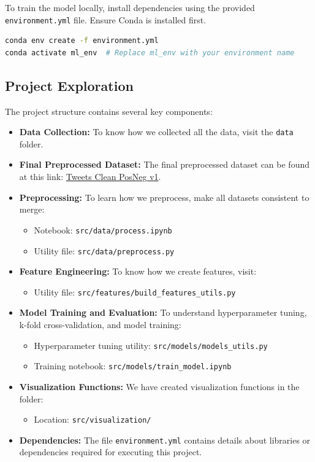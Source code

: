To train the model locally, install dependencies using the provided \texttt{environment.yml} file. Ensure Conda is installed first.

\begin{lstlisting}[language=bash]
conda env create -f environment.yml
conda activate ml_env  # Replace ml_env with your environment name
\end{lstlisting}

\subsection{Project Exploration}

The project structure contains several key components:

\begin{itemize}
    \item \textbf{Data Collection:} To know how we collected all the data, visit the \texttt{data} folder.
    \item \textbf{Final Preprocessed Dataset:} The final preprocessed dataset can be found at this link: 
    \href{https://www.kaggle.com/datasets/zphudzz/tweets-clean-posneg-v1}{Tweets Clean PosNeg v1}.
    \item \textbf{Preprocessing:} To learn how we preprocess, make all datasets consistent to merge:
    \begin{itemize}
        \item Notebook: \texttt{src/data/process.ipynb}
        \item Utility file: \texttt{src/data/preprocess.py}
    \end{itemize}
    \item \textbf{Feature Engineering:} To know how we create features, visit:
    \begin{itemize}
        \item Utility file: \texttt{src/features/build\_features\_utils.py}
    \end{itemize}
    \item \textbf{Model Training and Evaluation:} To understand hyperparameter tuning, k-fold cross-validation, and model training:
    \begin{itemize}
        \item Hyperparameter tuning utility: \texttt{src/models/models\_utils.py}
        \item Training notebook: \texttt{src/models/train\_model.ipynb}
    \end{itemize}
    \item \textbf{Visualization Functions:} We have created visualization functions in the folder:
    \begin{itemize}
        \item Location: \texttt{src/visualization/}
    \end{itemize}
    \item \textbf{Dependencies:} The file \texttt{environment.yml} contains details about libraries or dependencies required for executing this project.
\end{itemize}

\newpage
